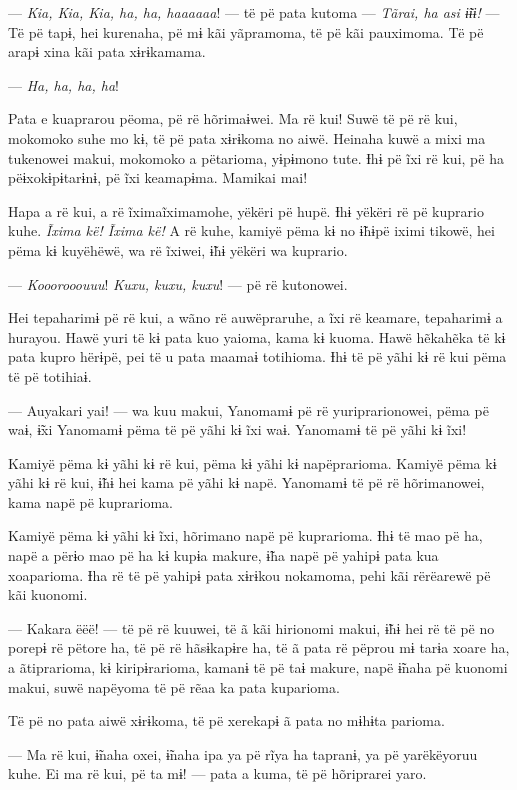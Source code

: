 --- \textit{Kia, Kia, Kia, ha, ha, haaaaaa}! --- të pë pata kutoma --- \textit{Tãrai, ha asi
ɨ̃ɨɨ!} --- Të pë tapɨ, hei kurenaha, pë mɨ kãi yãpramoma, të pë kãi
pauximoma. Të pë arapɨ xina kãi pata xɨrɨkamama. 

--- \textit{Ha, ha, ha, ha}! 

Pata e kuaprarou pëoma, pë rë hõrimaɨwei. Ma rë kui! Suwë të pë rë kui,
mokomoko suhe mo kɨ, të pë pata xɨrɨkoma no aiwë. Heinaha kuwë a mixi ma
tukenowei makui, mokomoko a pëtarioma, yɨpɨmono tute. Ɨhɨ pë ĩxi rë kui,
pë ha pëɨxokɨpɨtarɨnɨ, pë ĩxi keamapɨma. Mamikai mai! 

Hapa a rë kui, a rë ĩximaĩximamohe, yëkëri pë hupë. Ɨhɨ yëkëri rë pë
kuprario kuhe. \textit{Ĩxima kë! Ĩxima kë!} A rë kuhe, kamiyë pëma kɨ no ɨ̃hɨpë
iximi tikowë, hei pëma kɨ kuyëhëwë, wa rë ĩxiwei, ɨ̃hɨ yëkëri wa
kuprario. 

--- \textit{Kooorooouuu}! \textit{Kuxu, kuxu, kuxu}! --- pë rë kutonowei. 

Hei tepaharimɨ pë rë kui, a wãno rë auwëpraruhe, a ĩxi rë keamare,
tepaharimɨ a hurayou. Hawë yuri të kɨ pata kuo yaioma, kama kɨ kuoma.
Hawë hẽkahẽka të kɨ pata kupro hërɨpë, pei të u pata maamaɨ totihioma.
Ɨhɨ të pë yãhi kɨ rë kui pëma të pë totihiaɨ. 

--- Auyakari yai! --- wa kuu makui, Yanomamɨ pë rë yuriprarionowei, pëma pë
waɨ, ɨ̃xi Yanomamɨ pëma të pë yãhi kɨ ĩxi waɨ. Yanomamɨ të pë yãhi kɨ
ĩxi! 

Kamiyë pëma kɨ yãhi kɨ rë kui, pëma kɨ yãhi kɨ napëprarioma. Kamiyë pëma
kɨ yãhi kɨ rë kui, ɨ̃hɨ hei kama pë yãhi kɨ napë. Yanomamɨ të pë rë
hõrimanowei, kama napë pë kuprarioma. 

Kamiyë pëma kɨ yãhi kɨ ĩxi, hõrimano napë pë kuprarioma. Ɨhɨ të mao pë
ha, napë a përɨo mao pë ha kɨ kupɨa makure, ɨ̃ha napë pë yahipɨ pata kua
xoaparioma. Ɨha rë të pë yahipɨ pata xɨrɨkou nokamoma, pehi kãi
rërëarewë pë kãi kuonomi. 

--- Kakara ëëë! --- të pë rë kuuwei, të ã kãi hirionomi makui, ɨ̃hɨ hei rë
të pë no porepɨ rë pëtore ha, të pë rë hãsɨkapɨre ha, të ã pata rë
pëprou mɨ tarɨa xoare ha, a ãtiprarioma, kɨ kiripɨrarioma, kamanɨ të pë
taɨ makure, napë ɨ̃naha pë kuonomi makui, suwë napëyoma të pë rẽaa ka
pata kuparioma. 

Të pë no pata aiwë xɨrɨkoma, të pë xerekapɨ ã pata no mɨhɨta parioma. 

--- Ma rë kui, ɨ̃naha oxei, ɨ̃naha ipa ya pë rĩya ha tapranɨ, ya pë
yarëkëyoruu kuhe. Ei ma rë kui, pë ta mɨ! --- pata a kuma, të pë
hõriprarei yaro. 

